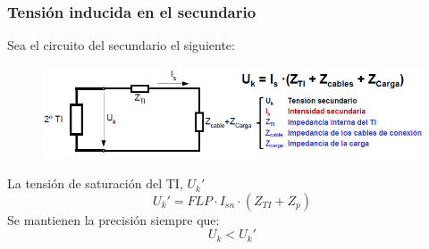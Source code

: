 \subsubsection{Tensión inducida en el secundario}
Sea el circuito del secundario el siguiente:
\begin{figure}[H]
	\centering
	\includegraphics[width=0.7\linewidth]{Images/48}
	\label{fig:48}
\end{figure}

La tensión de saturación del TI, $U_k'$
\begin{equation}
	U_k'=FLP\cdot I_{sn}\cdot \left(Z_{TI}+Z_p\right)
\end{equation}
Se mantienen la precisión siempre que:
\begin{equation}
	U_k<U_k'
\end{equation}
